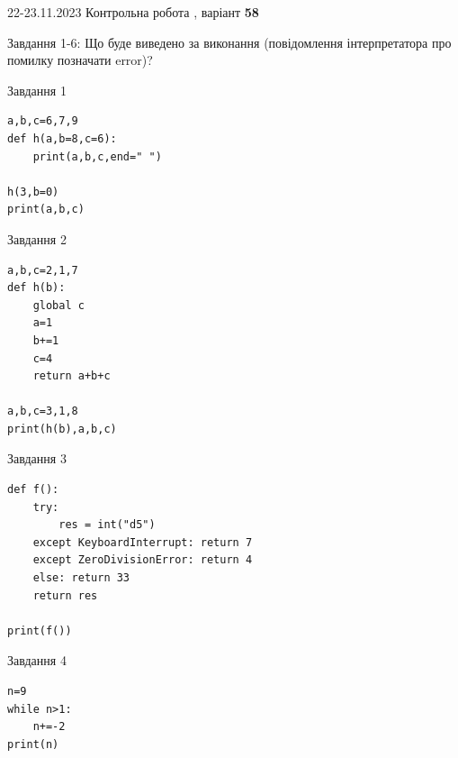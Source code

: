 \documentclass[12pt, ukrainian]{article}
\begin{document}
{{22-23.11.2023 Контрольна робота , варіант  \No \textbf { 58 }\par}}
{

Завдання 1-6: Що буде виведено за виконання (повідомлення інтерпретатора про помилку позначати error)?


\begin{minipage}[t]{9.7cm}                
{\begin{center}Завдання {1}\end{center}}
\begin{verbatim}
a,b,c=6,7,9
def h(a,b=8,c=6):
    print(a,b,c,end=" ")

h(3,b=0)
print(a,b,c)
\end{verbatim}     
\end{minipage}
\vline \hspace{8mm}
\begin{minipage}[t]{8.0cm}                
{\begin{center}Завдання {2}\end{center}}
\begin{verbatim}
a,b,c=2,1,7
def h(b):
    global c
    a=1
    b+=1
    c=4
    return a+b+c

a,b,c=3,1,8
print(h(b),a,b,c)
\end{verbatim}     
\end{minipage}

\vspace{15mm}
\begin{minipage}[t]{9.7cm}                
{\begin{center}Завдання {3}\end{center}}
\begin{verbatim}
def f():
    try:
        res = int("d5")
    except KeyboardInterrupt: return 7
    except ZeroDivisionError: return 4
    else: return 33
    return res

print(f())
\end{verbatim}     
\end{minipage}
\vline \hspace{8mm}
\begin{minipage}[t]{8.0cm}                
{\begin{center}Завдання {4}\end{center}}
\begin{verbatim}
n=9
while n>1:
    n+=-2
print(n)
\end{verbatim}     
\end{minipage}

}
\end{document}
